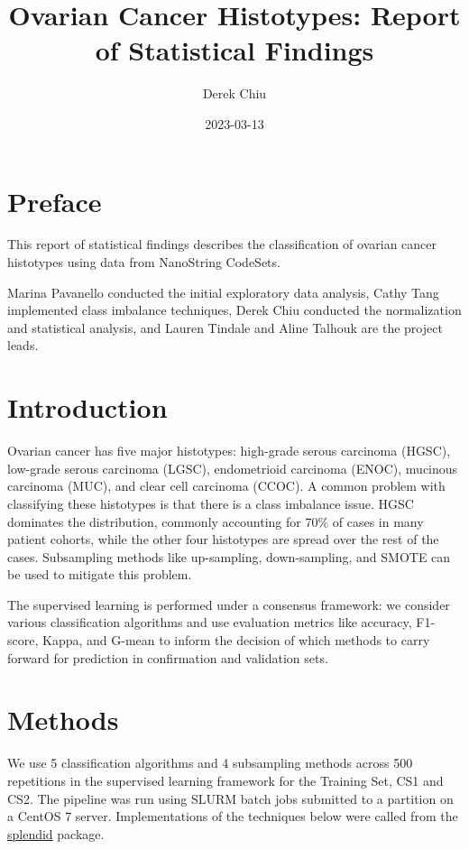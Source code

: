 \documentclass[
]{report}
\title{Ovarian Cancer Histotypes: Report of Statistical Findings}
\author{Derek Chiu}
\date{2023-03-13}
\begin{document}
\maketitle

{
\hypersetup{linkcolor=}
\setcounter{tocdepth}{1}
\tableofcontents
}
\listoffigures
\listoftables
\hypertarget{preface}{%
\chapter*{Preface}\label{preface}}

This report of statistical findings describes the classification of ovarian cancer histotypes using data from NanoString CodeSets.

Marina Pavanello conducted the initial exploratory data analysis, Cathy Tang implemented class imbalance techniques, Derek Chiu conducted the normalization and statistical analysis, and Lauren Tindale and Aline Talhouk are the project leads.

\hypertarget{introduction}{%
\chapter{Introduction}\label{introduction}}

Ovarian cancer has five major histotypes: high-grade serous carcinoma (HGSC), low-grade serous carcinoma (LGSC), endometrioid carcinoma (ENOC), mucinous carcinoma (MUC), and clear cell carcinoma (CCOC). A common problem with classifying these histotypes is that there is a class imbalance issue. HGSC dominates the distribution, commonly accounting for 70\% of cases in many patient cohorts, while the other four histotypes are spread over the rest of the cases. Subsampling methods like up-sampling, down-sampling, and SMOTE can be used to mitigate this problem.

The supervised learning is performed under a consensus framework: we consider various classification algorithms and use evaluation metrics like accuracy, F1-score, Kappa, and G-mean to inform the decision of which methods to carry forward for prediction in confirmation and validation sets.

\hypertarget{methods}{%
\chapter{Methods}\label{methods}}

We use 5 classification algorithms and 4 subsampling methods across 500 repetitions in the supervised learning framework for the Training Set, CS1 and CS2. The pipeline was run using SLURM batch jobs submitted to a partition on a CentOS 7 server. Implementations of the techniques below were called from the \href{https://alinetalhouk.github.io/splendid/}{splendid} package.
\end{document}
